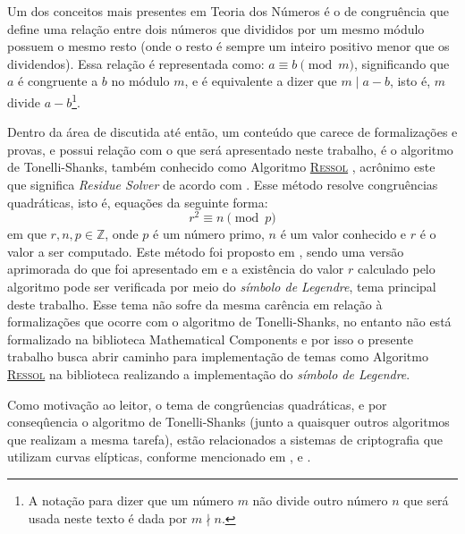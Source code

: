 Um dos conceitos mais presentes em Teoria dos Números é o de congruência que define uma relação entre dois números que divididos por um mesmo módulo possuem o mesmo resto (onde o resto é sempre um inteiro positivo menor que os dividendos). Essa relação é representada como: $a \equiv b \pmod{m}$, significando que $a$ é congruente a $b$ no módulo $m$, e é equivalente a dizer que $m \mid a - b$, isto é, $m$ divide $a - b$\footnote{A notação para dizer que um número $m$ não divide outro número $n$ que será usada neste texto é dada por $m \nmid n$.}.

Dentro da área de discutida até então, um conteúdo que carece de formalizações e provas, e possui relação com o que será apresentado neste trabalho, é o algoritmo de Tonelli-Shanks, também conhecido como Algoritmo \hyperref[algo:ressol]{\textsc{Ressol}} \cite{Huynh1581080}, acrônimo este que significa \textit{Residue Solver} de acordo com \cite{Niven1915}. Esse método resolve congruências quadráticas, isto é, equações da seguinte forma:
\begin{equation}
    \label{eq:congruenciaquadratica}
    r^2 \equiv n \pmod p
\end{equation}
em que $r, n, p \in \mathbb{Z}$, onde $p$ é um número primo, $n$ é um valor conhecido e $r$ é o valor a ser computado. Este método foi proposto em , sendo uma versão aprimorada do que foi apresentado em \cite{Tonelli1891} e a existência do valor $r$ calculado pelo algoritmo pode ser verificada por meio do \textit{símbolo de Legendre}, tema principal deste trabalho. Esse tema não sofre da mesma carência em relação à formalizações que ocorre com o algoritmo de Tonelli-Shanks, no entanto não está formalizado na biblioteca Mathematical Components e por isso o presente trabalho busca abrir caminho para implementação de temas como Algoritmo \hyperref[algo:ressol]{\textsc{Ressol}} na biblioteca realizando a implementação do \textit{símbolo de Legendre}.

Como motivação ao leitor, o tema de congrûencias quadráticas, e por conseqûencia o algoritmo de Tonelli-Shanks (junto a quaisquer outros algoritmos que realizam a mesma tarefa), estão relacionados a sistemas de criptografia que utilizam curvas elípticas, conforme mencionado em \cite{PalashSarkar2024AdvancesinMathematicsofCommunications}, \cite{kumar2021algorithm} e \cite{7133812}.


